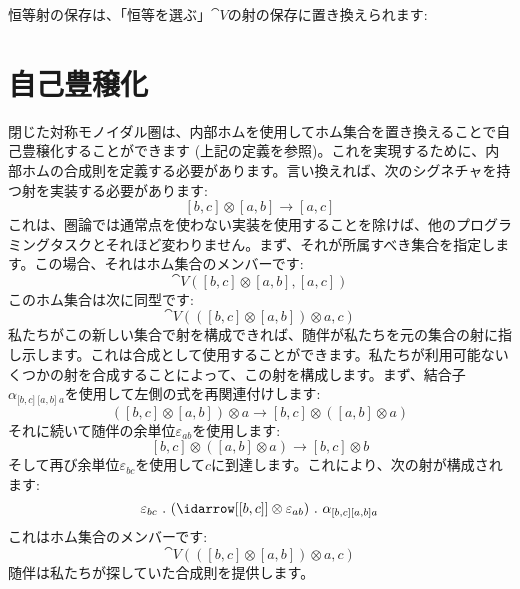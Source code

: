 \begin{figure}[H]
  \centering
\end{figure}

\noindent
恒等射の保存は、「恒等を選ぶ」$\cat{V}$の射の保存に置き換えられます: 

\begin{figure}[H]
  \centering
\end{figure}

\section{自己豊穣化}

閉じた対称モノイダル圏は、内部ホムを使用してホム集合を置き換えることで自己豊穣化することができます (上記の定義を参照)。これを実現するために、内部ホムの合成則を定義する必要があります。言い換えれば、次のシグネチャを持つ射を実装する必要があります: 
\[[b, c] \otimes [a, b] \to [a, c]\]
これは、圏論では通常点を使わない実装を使用することを除けば、他のプログラミングタスクとそれほど変わりません。まず、それが所属すべき集合を指定します。この場合、それはホム集合のメンバーです: 
\[\cat{V}([b, c] \otimes [a, b], [a, c])\]
このホム集合は次に同型です: 
\[\cat{V}(([b, c] \otimes [a, b]) \otimes a, c)\]
私たちがこの新しい集合で射を構成できれば、随伴が私たちを元の集合の射に指し示します。これは合成として使用することができます。私たちが利用可能ないくつかの射を合成することによって、この射を構成します。まず、結合子$\alpha_{{[}b, c{]}\ {[}a, b{]}\ a}$を使用して左側の式を再関連付けします: 
\[([b, c] \otimes [a, b]) \otimes a \to [b, c] \otimes ([a, b] \otimes a)\]
それに続いて随伴の余単位$\varepsilon_{a b}$を使用します: 
\[[b, c] \otimes ([a, b] \otimes a) \to [b, c] \otimes b\]
そして再び余単位$\varepsilon_{b c}$を使用して$c$に到達します。これにより、次の射が構成されます: 
\[\varepsilon_{b c}\ .\ (\idarrow[{[b, c]}] \otimes \varepsilon_{a b})\ .\ \alpha_{[b, c] [a, b] a}\]
これはホム集合のメンバーです: 
\[\cat{V}(([b, c] \otimes [a, b]) \otimes a, c)\]
随伴は私たちが探していた合成則を提供します。

